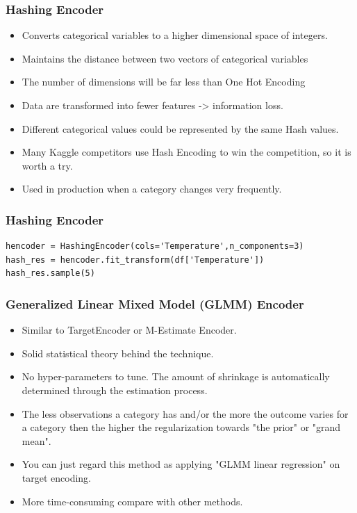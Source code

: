 \documentclass{beamer}
\begin{document}
    \begin{frame}
        \frametitle{Hashing Encoder}
        \begin{itemize}
            \item Converts categorical variables to a higher dimensional space of integers.
            \pause
            \item Maintains the distance between two vectors of categorical variables
            \pause
            \item The number of dimensions will be far less than One Hot Encoding
            \pause
            \item Data are transformed into fewer features -> information loss.
            \pause
            \item Different categorical values could be represented by the same Hash values.
            \pause
            \item Many Kaggle competitors use Hash Encoding to win the competition, so it is
            worth a try.
            \pause
            \item Used in production when a category changes very frequently.
        \end{itemize}
    \end{frame}

    \begin{frame}[fragile]
        \frametitle{Hashing Encoder}
        \begin{lstlisting}
hencoder = HashingEncoder(cols='Temperature',n_components=3)
hash_res = hencoder.fit_transform(df['Temperature'])
hash_res.sample(5)
        \end{lstlisting}
    \end{frame}

    \begin{frame}
        \frametitle{Generalized Linear Mixed Model (GLMM) Encoder }
        \begin{itemize}
            \item Similar to TargetEncoder or M-Estimate Encoder.
            \pause
            \item Solid statistical theory behind the technique.
            \pause
            \item No hyper-parameters to tune. The amount of shrinkage is automatically
            determined through the estimation process.
            \pause
            \item The less observations a category has and/or the more the outcome varies for a
            category then the higher the regularization towards "the prior" or "grand mean".
            \pause
            \item You can just regard this method as applying "GLMM linear regression" on target
            encoding.
            \pause
            \item More time-consuming compare with other methods.
        \end{itemize}
    \end{frame}
\end{document}
